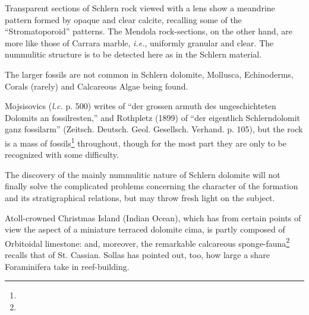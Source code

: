 \documentclass[a4paper, 12pt, oneside]{article}
\begin{document}
Transparent sections of Schlern rock viewed with a lens show a meandrine pattern formed by opaque and clear calcite, recalling some of the ``Stromatoporoid'' patterns. The Mendola rock-sections, on the other hand, are more like those of Carrara marble, \emph{i.e.}, uniformly granular and clear. The nummulitic structure is to be detected here as in the Schlern material.

The larger fossils are not common in Schlern dolomite, Mollusca, Echinoderms, Corals (rarely) and Calcareous Algae being found.

Mojsisovics (\emph{l.c.} p. 500) writes of ``der grossen armuth des ungeschichteten Dolomits an fossilresten,'' and Rothpletz (1899) of ``der eigentlich Schlerndolomit ganz fossilarm'' (Zeitsch. Deutsch. Geol. Gesellsch. Verhand. p. 105), but the rock is a mass of fossils\footnote{} throughout, though for the most part they are only to be recognized with some difficulty.

The discovery of the mainly nummulitic nature of Schlern dolomite will not finally solve the complicated problems concerning the character of the formation and its stratigraphical relations, but may throw fresh light on the subject.

Atoll-crowned Christmas Island (Indian Ocean), which has from certain points of view the aspect of a miniature terraced dolomite cima, is partly composed of Orbitoidal limestone: and, moreover, the remarkable calcareous sponge-fauna\footnote{} recalls that of St. Cassian. Sollas has pointed out, too, how large a share Foraminifera take in reef-building.
\end{document}
